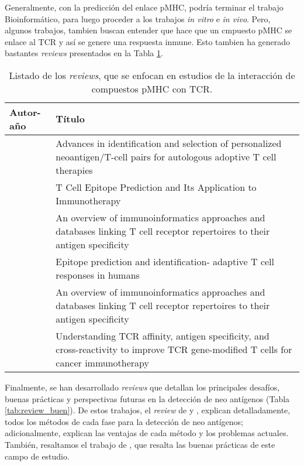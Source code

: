 Generalmente, con la predicción del enlace pMHC, podría terminar el trabajo Bioinformático, para luego proceder a los trabajos \textit{in vitro} e \textit{in vivo}. Pero, algunos trabajos, tambien buscan entender que hace que un cmpuesto pMHC se enlace al TCR y así se genere una respuesta inmune. Esto tambien ha generado bastantes \textit{reviews} presentados en la Tabla \ref{tab:review_tcr}.

\begin{table}[H]
	\caption{Listado de los \textit{reviews}, que se enfocan en estudios de la interacción de compuestos pMHC con TCR.}
	\label{tab:review_tcr}
	\begin{tabular}{p{3cm}p{10cm}}
		\textbf{Autor-año }                            & \textbf{Título}                                                                                                                             \\ \hline
		\cite{kast2021advances}     & Advances in identification and selection of personalized neoantigen/T-cell pairs for autologous adoptive T cell therapies           \\
		\cite{schaap2021t}          & T Cell Epitope Prediction and Its Application to Immunotherapy                                                                      \\                                    
		\cite{zvyagin2020overview}  & An overview of immunoinformatics approaches and databases linking T cell receptor repertoires to their antigen specificity          \\
		\cite{sidney2020epitope}    & Epitope prediction and identification- adaptive T cell responses in humans                                                          \\
		
		\cite{zvyagin2020overview}  & An overview of immunoinformatics approaches and databases linking T cell receptor repertoires to their antigen specificity          \\
		\cite{spear2019understanding} & Understanding TCR affinity, antigen specificity, and cross-reactivity to improve TCR gene-modified T cells for cancer immunotherapy \\		                                               
		\end{tabular}
	\end{table}


Finalmente, se han desarrollado \textit{reviews} que detallan los principales desafíos, buenas prácticas y perspectivas futuras en la detección de neo antígenos (Tabla \ref{tab:review_buen}). De estos trabajos, el \textit{review} de \cite{gopanenko2020main} y \cite{borden2022cancer}, explican detalladamente, todos los métodos de cada fase para la detección de neo antígenos; adicionalmente, explican las ventajas de cada método y los problemas actuales. También, resaltamos el trabajo de \cite{richters2019best}, que resalta las buenas prácticas de este campo de estudio.




